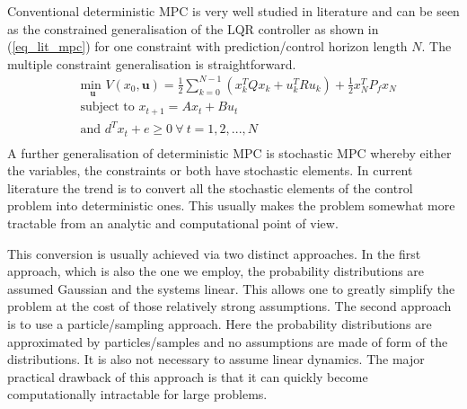 Conventional deterministic MPC is very well studied in literature \cite{raw} and can be seen as the constrained generalisation of the LQR controller as shown in (\ref{eq_lit_mpc}) for one constraint with prediction/control horizon length $N$. The multiple constraint generalisation is straightforward.
\begin{equation}
\begin{aligned}
&\underset{\mathbf{u}}{\text{min }} V(x_0, \mathbf{u}) = \frac{1}{2}\sum_{k=0}^{N-1} \left( x_k^TQx_k + u_k^TRu_k \right) + \frac{1}{2}x_N^TP_fx_N \\
& \text{subject to } x_{t+1} = Ax_t+Bu_t \\
& \text{and } d^Tx_t + e \geq 0 ~\forall~t=1, 2,...,N \\
\end{aligned}
\label{eq_lit_mpc}
\end{equation}
A further generalisation of deterministic MPC is stochastic MPC whereby either the variables, the constraints or both have stochastic elements. In current literature the trend is to convert all the stochastic elements of the control problem into deterministic ones. This usually makes the problem somewhat more tractable from an analytic and computational point of view.

This conversion is usually achieved via two distinct approaches. In the first approach, which is also the one we employ, the probability distributions are assumed Gaussian and the systems linear. This allows one to greatly simplify the problem at the cost of those relatively strong assumptions. The second approach is to use a particle/sampling approach. Here the probability distributions are approximated by particles/samples and no assumptions are made of form of the distributions. It is also not necessary to assume linear dynamics. The major practical drawback of this approach is that it can quickly become computationally intractable for large problems.

